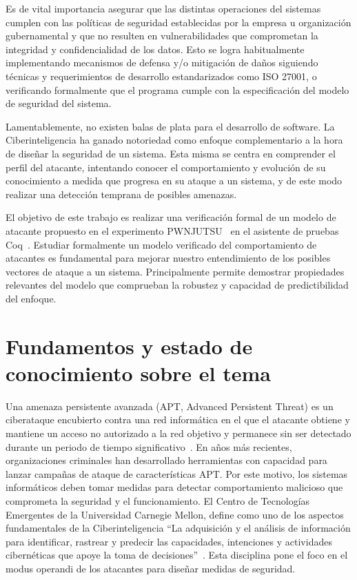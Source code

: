 \documentclass[a4paper,12pt]{article}
\begin{document}
Es de vital importancia asegurar que las distintas operaciones del sistemas cumplen con las políticas de seguridad establecidas por la empresa u organización gubernamental y que no resulten en vulnerabilidades que comprometan la integridad y confidencialidad de los datos. Esto se logra habitualmente implementando mecanismos de defensa y/o mitigación de daños siguiendo técnicas y requerimientos de desarrollo estandarizados como ISO 27001, o verificando formalmente que el programa cumple con la especificación del modelo de seguridad del sistema.

Lamentablemente, no existen balas de plata para el desarrollo de software. La Ciberinteligencia ha ganado notoriedad como enfoque complementario a la hora de diseñar la seguridad de un sistema. Esta misma se centra en comprender el perfil del atacante, intentando conocer el comportamiento y evolución de su conocimiento a medida que progresa en su ataque a un sistema, y de este modo realizar una detección temprana de posibles amenazas.

El objetivo de este trabajo es realizar una verificación formal de un modelo de atacante propuesto en el experimento PWNJUTSU~\cite{pwnjutsu} en el asistente de pruebas Coq~\cite{coq}. Estudiar formalmente un modelo verificado del comportamiento de atacantes es fundamental para mejorar nuestro entendimiento de los posibles vectores de ataque a un sistema. Principalmente permite demostrar propiedades relevantes del modelo que comprueban la robustez y capacidad de predictibilidad del enfoque.


\section{Fundamentos y estado de conocimiento sobre el tema}
Una amenaza persistente avanzada (APT, Advanced Persistent Threat) es un ciberataque encubierto contra una red informática en el que el atacante obtiene y mantiene un acceso no autorizado a la red objetivo y permanece sin ser detectado durante un periodo de tiempo significativo~\cite{apt}. En años más recientes, organizaciones criminales han desarrollado herramientas con capacidad para lanzar campañas de ataque de características APT. Por este motivo, los sistemas informáticos deben tomar medidas para detectar comportamiento malicioso que comprometa la seguridad y el funcionamiento. El Centro de Tecnologías Emergentes de la Universidad Carnegie Mellon, define como uno de los aspectos fundamentales de la Ciberinteligencia “La adquisición y el análisis de información para identificar, rastrear y predecir las capacidades, intenciones y actividades cibernéticas que apoye la toma de decisiones”~\cite{ciberinteligencia}. Esta disciplina pone el foco en el modus operandi de los atacantes para diseñar medidas de seguridad.
\end{document}
